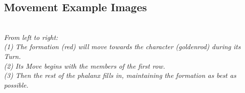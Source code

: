 \subsection*{Movement Example Images}
\begin{center}
\\
\emph{From left to right:\\
(1) The formation (red) will move towards the character (goldenrod) during its Turn.\\
(2) Its Move begins with the members of the first row.\\
(3) Then the rest of the phalanx fills in, maintaining the formation as best as possible.}\\


\end{center}
